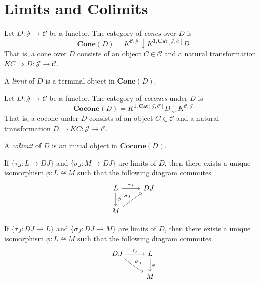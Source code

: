 \chapter{Limits and Colimits}

\begin{df}[Limit]
Let $D : \mathcal{J} \rightarrow \mathcal{C}$ be a functor. The category of \emph{cones} over $D$ is
\[ \mathbf{Cone}(D) = K^\mathcal{\mathcal{C},\mathcal{J}} \downarrow K^{\mathbf{1},\mathbf{Cat}[\mathcal{J},\mathcal{C}]}D \]
That is, a cone over $D$ consists of an object $C \in \mathcal{C}$ and a natural transformation $KC \Rightarrow D : \mathcal{J} \rightarrow \mathcal{C}$.

A \emph{limit} of $D$ is a terminal object in $\mathbf{Cone}(D)$.
\end{df}

\begin{df}[Colimit]
Let $D : \mathcal{J} \rightarrow \mathcal{C}$ be a functor. The category of \emph{cocones} under $D$ is
\[ \mathbf{Cocone}(D) = K^{\mathbf{1},\mathbf{Cat}[\mathcal{J},\mathcal{C}]}D \downarrow K^\mathcal{\mathcal{C},\mathcal{J}} \]
That is, a cocone under $D$ consists of an object $C \in \mathcal{C}$ and a natural transformation $D \Rightarrow KC : \mathcal{J} \rightarrow \mathcal{C}$.

A \emph{colimit} of $D$ is an initial object in $\mathbf{Cocone}(D)$.
\end{df}

\begin{thm}
If $\{ \tau_J : L \rightarrow D J \}$ and $\{ \sigma_J : M \rightarrow D J \}$ are limits of $D$, then there exists a unique isomorphism $\phi : L \cong M$ such that the following diagram commutes
\[ \begin{tikzcd}
L \arrow[r,"\tau_J"] \arrow[d,"\phi"] & D J \\
M \arrow[ur,"\sigma_J"]
\end{tikzcd} \]
\end{thm}

\begin{thm}
If $\{ \tau_J : D J \rightarrow L \}$ and $\{ \sigma_J : D J \rightarrow M \}$ are limits of $D$, then there exists a unique isomorphism $\phi : L \cong M$ such that the following diagram commutes
\[ \begin{tikzcd}
D J \arrow[r,"\tau_J"] \arrow[dr,"\sigma_J"] & L \arrow[d,"\phi"] \\
& M
\end{tikzcd} \]
\end{thm}

